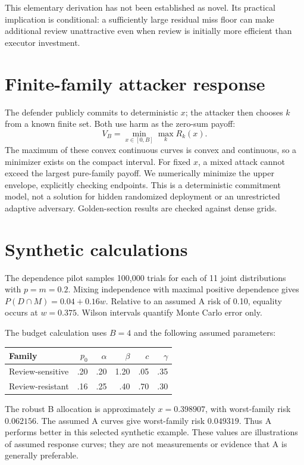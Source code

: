 \documentclass[11pt]{article}
\begin{document}
This elementary derivation has not been established as novel. Its practical
implication is conditional: a sufficiently large residual miss floor can make
additional review unattractive even when review is initially more efficient
than executor investment.

\section{Finite-family attacker response}
The defender publicly commits to deterministic $x$; the attacker then chooses
$k$ from a known finite set. Both use harm as the zero-sum payoff:
\[
 V_B=\min_{x\in[0,B]}\max_k R_k(x).
\]
The maximum of these convex continuous curves is convex and continuous, so a
minimizer exists on the compact interval. For fixed $x$, a mixed attack cannot
exceed the largest pure-family payoff. We numerically minimize the upper
envelope, explicitly checking endpoints. This is a deterministic commitment
model, not a solution for hidden randomized deployment or an unrestricted
adaptive adversary. Golden-section results are checked against dense grids.

\section{Synthetic calculations}
The dependence pilot samples 100,000 trials for each of 11 joint distributions
with $p=m=0.2$. Mixing independence with maximal positive dependence gives
$P(D\cap M)=0.04+0.16w$. Relative to an assumed A risk of 0.10, equality
occurs at $w=0.375$. Wilson intervals quantify Monte Carlo error only.

The budget calculation uses $B=4$ and the following assumed parameters:
\begin{center}
\begin{tabular}{lrrrrr}
\toprule
Family & $p_0$ & $\alpha$ & $\beta$ & $c$ & $\gamma$\\
\midrule
Review-sensitive & .20 & .20 & 1.20 & .05 & .35\\
Review-resistant & .16 & .25 & .40 & .70 & .30\\
\bottomrule
\end{tabular}
\end{center}
The robust B allocation is approximately $x=0.398907$, with worst-family
risk $0.062156$. The assumed A curves give worst-family risk $0.049319$.
Thus A performs better in this selected synthetic example. These values are
illustrations of assumed response curves; they are not measurements or
evidence that A is generally preferable.
\end{document}
